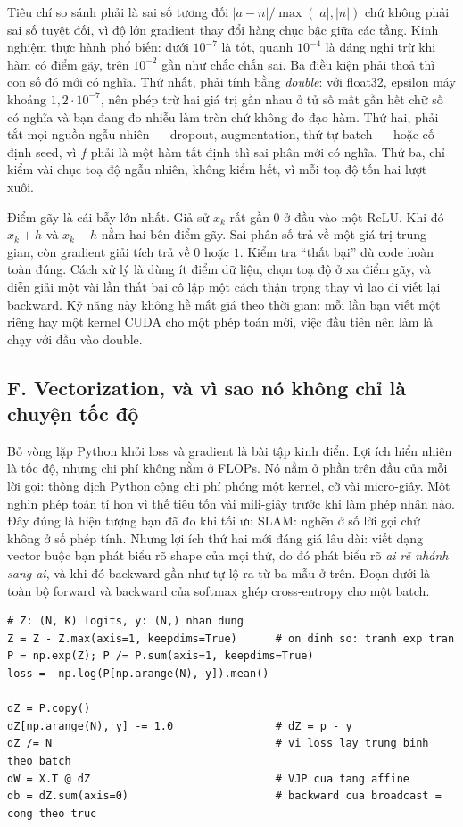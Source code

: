 \documentclass[../../../deep_learning.tex]{subfiles}
\begin{document}
Tiêu chí so sánh phải là sai số tương đối \(|a-n| / \max(|a|,|n|)\) chứ không phải sai số tuyệt đối, vì độ lớn gradient thay đổi hàng chục bậc giữa các tầng. Kinh nghiệm thực hành phổ biến: dưới \(10^{-7}\) là tốt, quanh \(10^{-4}\) là đáng nghi trừ khi hàm có điểm gãy, trên \(10^{-2}\) gần như chắc chắn sai. Ba điều kiện phải thoả thì con số đó mới có nghĩa. Thứ nhất, phải tính bằng \emph{double}: với float32, epsilon máy khoảng \(1{,}2\cdot 10^{-7}\), nên phép trừ hai giá trị gần nhau ở tử số mất gần hết chữ số có nghĩa và bạn đang đo nhiễu làm tròn chứ không đo đạo hàm. Thứ hai, phải tắt mọi nguồn ngẫu nhiên --- dropout, augmentation, thứ tự batch --- hoặc cố định seed, vì \(f\) phải là một hàm tất định thì sai phân mới có nghĩa. Thứ ba, chỉ kiểm vài chục toạ độ ngẫu nhiên, không kiểm hết, vì mỗi toạ độ tốn hai lượt xuôi.

Điểm gãy là cái bẫy lớn nhất. Giả sử \(x_k\) rất gần \(0\) ở đầu vào một ReLU. Khi đó \(x_k + h\) và \(x_k - h\) nằm hai bên điểm gãy. Sai phân số trả về một giá trị trung gian, còn gradient giải tích trả về \(0\) hoặc \(1\). Kiểm tra ``thất bại'' dù code hoàn toàn đúng. Cách xử lý là dùng ít điểm dữ liệu, chọn toạ độ ở xa điểm gãy, và diễn giải một vài lần thất bại cô lập một cách thận trọng thay vì lao đi viết lại backward. Kỹ năng này không hề mất giá theo thời gian: mỗi lần bạn viết một  riêng hay một kernel CUDA cho một phép toán mới, việc đầu tiên nên làm là chạy  với đầu vào double.

\subsection{F. Vectorization, và vì sao nó không chỉ là chuyện tốc độ}
Bỏ vòng lặp Python khỏi loss và gradient là bài tập kinh điển. Lợi ích hiển nhiên là tốc độ, nhưng chi phí không nằm ở FLOPs. Nó nằm ở phần trên đầu của mỗi lời gọi: thông dịch Python cộng chi phí phóng một kernel, cỡ vài micro-giây. Một nghìn phép toán tí hon vì thế tiêu tốn vài mili-giây trước khi làm phép nhân nào. Đây đúng là hiện tượng bạn đã đo khi tối ưu SLAM: nghẽn ở số lời gọi chứ không ở số phép tính. Nhưng lợi ích thứ hai mới đáng giá lâu dài: viết dạng vector buộc bạn phát biểu rõ shape của mọi thứ, do đó phát biểu rõ \emph{ai rẽ nhánh sang ai}, và khi đó backward gần như tự lộ ra từ ba mẫu ở trên. Đoạn dưới là toàn bộ forward và backward của softmax ghép cross-entropy cho một batch.

\begin{lstlisting}[style=py]
# Z: (N, K) logits, y: (N,) nhan dung
Z = Z - Z.max(axis=1, keepdims=True)      # on dinh so: tranh exp tran
P = np.exp(Z); P /= P.sum(axis=1, keepdims=True)
loss = -np.log(P[np.arange(N), y]).mean()

dZ = P.copy()
dZ[np.arange(N), y] -= 1.0                # dZ = p - y
dZ /= N                                   # vi loss lay trung binh theo batch
dW = X.T @ dZ                             # VJP cua tang affine
db = dZ.sum(axis=0)                       # backward cua broadcast = cong theo truc
\end{lstlisting}
\end{document}
